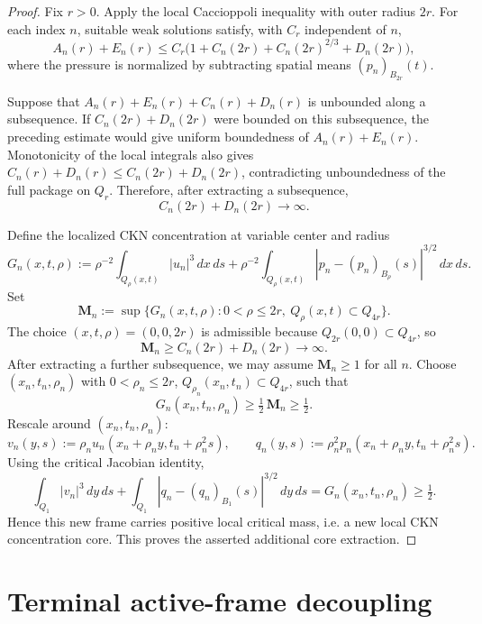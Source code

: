\documentclass[11pt]{amsart}
\theoremstyle{plain}
\theoremstyle{definition}
\theoremstyle{remark}
\begin{document}
\begin{proof}
Fix \(r>0\).  Apply the local Caccioppoli inequality with outer radius \(2r\).
For each index \(n\), suitable weak solutions satisfy, with \(C_r\) independent
of \(n\),
\[
  A_n(r)+E_n(r)
  \le C_r\bigl(1+C_n(2r)+C_n(2r)^{2/3}+D_n(2r)\bigr),
\]
where the pressure is normalized by subtracting spatial means
\((p_n)_{B_{2r}}(t)\).
\par
Suppose that \(A_n(r)+E_n(r)+C_n(r)+D_n(r)\) is unbounded along a subsequence.
If \(C_n(2r)+D_n(2r)\) were bounded on this subsequence, the preceding estimate
would give uniform boundedness of \(A_n(r)+E_n(r)\).  Monotonicity of the local
integrals also gives \(C_n(r)+D_n(r)\le C_n(2r)+D_n(2r)\), contradicting
unboundedness of the full package on \(Q_r\).  Therefore, after extracting a
subsequence,
\[
  C_n(2r)+D_n(2r)\to\infty .
\]
\par
Define the localized CKN concentration at variable center and radius
\[
  G_n(x,t,\rho):=\rho^{-2}\int_{Q_\rho(x,t)}|u_n|^3\,dx\,ds
  +\rho^{-2}\int_{Q_\rho(x,t)}|p_n-(p_n)_{B_\rho}(s)|^{3/2}\,dx\,ds.
\]
Set
\[
  \mathbf M_n:=\sup\{G_n(x,t,\rho):0<\rho\le 2r,\ Q_\rho(x,t)\subset Q_{4r}\}.
\]
The choice \((x,t,\rho)=(0,0,2r)\) is admissible because \(Q_{2r}(0,0)\subset Q_{4r}\), so
\[
  \mathbf M_n\ge C_n(2r)+D_n(2r)\to\infty.
\]
After extracting a further subsequence, we may assume \(\mathbf M_n\ge1\) for all \(n\).
Choose \((x_n,t_n,\rho_n)\) with \(0<\rho_n\le2r\), \(Q_{\rho_n}(x_n,t_n)\subset Q_{4r}\),
such that
\[
  G_n(x_n,t_n,\rho_n)\ge\tfrac12\,\mathbf M_n\ge\tfrac12.
\]
Rescale around \((x_n,t_n,\rho_n)\):
\[
  v_n(y,s):=\rho_nu_n(x_n+\rho_n y,t_n+\rho_n^2 s),\qquad
  q_n(y,s):=\rho_n^2p_n(x_n+\rho_n y,t_n+\rho_n^2 s).
\]
Using the critical Jacobian identity,
\[
  \int_{Q_1}|v_n|^3\,dy\,ds
  +\int_{Q_1}|q_n-(q_n)_{B_1}(s)|^{3/2}\,dy\,ds
  =G_n(x_n,t_n,\rho_n)\ge\tfrac12.
\]
Hence this new frame carries positive local critical mass, i.e. a new local CKN
concentration core.  This proves the asserted additional core extraction.
\end{proof}

\section{Terminal active-frame decoupling}
\end{document}
